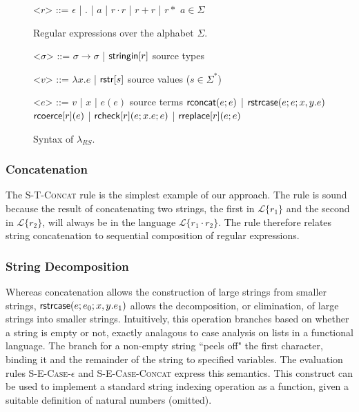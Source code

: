 \documentclass[10pt]{sigplanconf}
\theoremstyle{definition}
\newcommand{\Lagr}{\mathcal{L}}
\newcommand{\lang}[1]{\Lagr\{#1\}}
\newcommand{\sisubst}[3]{{\sf rreplace}[#1](#2;#3)} \newcommand{\rreplace}[3]{{\sf rreplace}[#1](#2;#3)} %
\newcommand{\rcoerce}[2]{{\sf rcoerce}[#1](#2)}
\newcommand{\sistr}[1]{{\sf rstr}[#1]}   \newcommand{\rstr}[1]{{\sf rstr}[#1]} %
\newcommand{\rcheck}[4]{ {\sf rcheck}[#1](#2;#3;#4) }
\newcommand{\strin}[1]{\sistr{#1}}
\newcommand{\rsconcat}[2]{{\sf rconcat}(#1;#2)} \newcommand{\rconcat}[2]{{\sf rconcat}(#1;#2)} %
\newcommand{\stringin}[1]{{\sf stringin}[#1]}
\newcommand{\strcase}[3]{ {\sf rstrcase}(#1; #2; #3)}
\begin{document}
\renewcommand{\grammarlabel}[2]{#1\hfill#2}
\begin{figure}[t]
\footnotesize
  \begin{grammar}
<$r$> ::= $\epsilon$ | $.$ | $a$ | $r \cdot r$ | $r + r$ | $r*$ \hfill $a \in \Sigma$

\caption{Regular expressions over the alphabet $\Sigma$.}
\label{fig:regex}
\end{grammar}
\end{figure}
\begin{figure}[t]
\footnotesize
  \begin{grammar}
<$\sigma$> ::=  $\sigma \rightarrow \sigma$ | $\stringin{r}$    \hfill  source types
\vspace{-8px}

<$v$> ::= $\lambda x . e$ | $\strin{s}$ \hfill source values ($s \in \Sigma^{*}$) 
\vspace{-8px}

<$e$> ::= 
      $v$ | $x$ | $e(e)$   \hfill source terms \alt 
      $\rsconcat{e}{e}$ | $\strcase{e}{e}{x,y.e}$ \alt
      $\rcoerce{r}{e}$ | $\rcheck{r}{e}{x.e}{e}$ | $\sisubst{r}{e}{e}$  
      \caption{Syntax of $\lambda_{RS}$.}
\label{fig:glambdas}
\end{grammar}
\end{figure}





\subsubsection{Concatenation}

The \textsc{S-T-Concat} rule is the simplest example of our approach. The rule is sound because the result of concatenating two strings, the first in $\lang{r_1}$ and the second in $\lang{r_2}$, will always be in the language $\lang{r_1\cdot r_2}$. The rule therefore relates string concatenation to sequential composition of regular expressions.

\subsubsection{String Decomposition}
Whereas concatenation allows the construction of large strings from smaller strings,  $\strcase{e}{e_0}{x,y.e_1}$  allows the decomposition, or elimination, of large strings into smaller strings. Intuitively, this operation branches based on whether a string is empty or not, exactly analagous to case analysis on lists in a functional language. The branch for a non-empty string ``peels off" the first character, binding it and the remainder of the string to specified variables. The evaluation rules \textsc{S-E-Case-$\epsilon$} and \textsc{S-E-Case-Concat} express this semantics. This construct can be used to implement a standard string indexing operation as a function, given a suitable definition of natural numbers (omitted).
\end{document}

